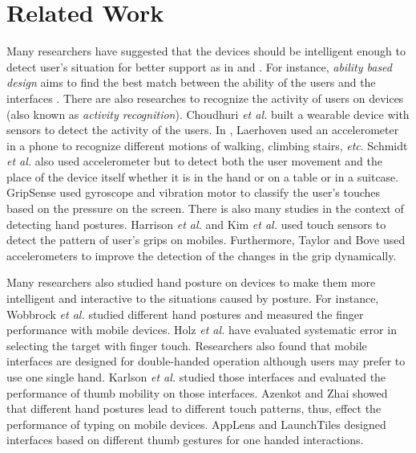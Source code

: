 \section{Related Work}
Many researchers have suggested that the devices should be intelligent enough to detect user's situation for better support as in \cite{Johnson:1998:UMIM} and \cite{Schmidt:1999:AIC}. For instance, \emph{ability based design} aims to find the best match between the ability of the users and the interfaces \cite{Wobbrock:2011:adcpe}. There are also researches to recognize the activity of users on devices (also known as \emph{activity recognition}). Choudhuri \emph{et al.} \cite{Choudhury:2008:MSP} built a wearable device with sensors to detect the activity of the users. In \cite{Van:2000:WhatShallWe}, Laerhoven used an accelerometer in a phone to recognize different motions of walking, climbing stairs, \emph{etc}. Schmidt \emph{et al.} \cite{Schmidt:1999:AIC} also used accelerometer but to detect both the user movement and the place of the device itself whether it is in the hand or on a table or in a suitcase. GripSense \cite{Goel:2012:gripsense} used gyroscope and vibration motor to classify the user's touches based on the pressure on the screen. There is also many studies in the context of detecting hand postures. Harrison \emph{et al.} \cite{harrison:1998:squeeze} and Kim \emph{et al.} \cite{kim:2006:hand} used touch sensors to detect the pattern of user's grips on mobiles. Furthermore, Taylor and Bove \cite{taylor:2009:graspables} used accelerometers to improve the detection of the changes in the grip dynamically.
\par
Many researchers also studied hand posture on devices to make them more intelligent and interactive to the situations caused by posture. For instance, Wobbrock \emph{et al.} \cite{Wobbrock:2008:PHP} studied different hand postures and measured the finger performance with mobile devices. Holz \emph{et al.} \cite{Holz:2011:UT} have evaluated systematic error in selecting the target with finger touch. Researchers \cite{Hinckley:2011:SST,Weberg:2001:PBP,Karlson:2005:ALT} also found that mobile interfaces are designed for double-handed operation although users may prefer to use one single hand. Karlson \emph{et al.} \cite{Karlson:2006:usm} studied those interfaces and evaluated the performance of thumb mobility on those interfaces. Azenkot and Zhai \cite{Azenkot:2012:TBD} showed that different hand postures lead to different touch patterns, thus, effect the performance of typing on mobile devices. AppLens and LaunchTiles \cite{Karlson:2005:ALT} designed interfaces based on different thumb gestures for one handed interactions.
